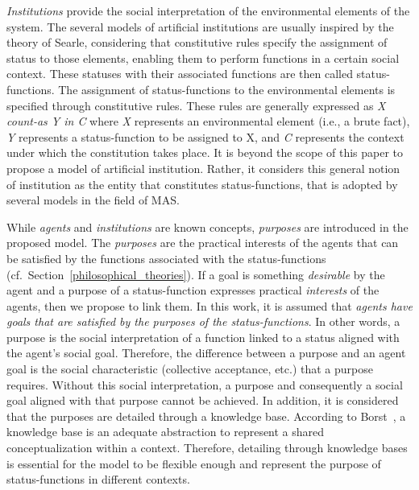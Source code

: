\documentclass[runningheads]{llncs}
\begin{document}
\emph{Institutions} provide the social interpretation of the environmental elements of the system. The several models of artificial institutions are usually inspired by the theory of Searle, considering that constitutive rules specify the assignment of status to those elements, enabling them to perform functions in a certain social context. These statuses with their associated functions are then called status-functions. 
The assignment of status-functions to the environmental elements is specified through constitutive rules. 
These rules are generally expressed as \emph{X count-as Y in C} where \emph{X} represents an environmental element (i.e., a brute fact), \emph{Y} represents a status-function to be assigned to X, and \emph{C} represents the context under which the constitution takes place. It is beyond the scope of this paper to propose a model of artificial institution. Rather, it considers this general notion of institution as the entity that constitutes status-functions, that is adopted by several models in the field of MAS.


While \emph{agents} and \emph{institutions} are known concepts, \emph{purposes} are introduced in the proposed model.
The \emph{purposes} are the practical interests of the agents that can be satisfied by the functions associated with the status-functions (cf.~Section~\ref{philosophical_theories}). If a goal is something \emph{desirable} by the agent and a purpose of a status-function expresses practical \emph{interests} of the agents, then we propose to link them. 
In this work, it is assumed that \textit{agents have goals that are satisfied by the purposes of the status-functions}. 
In other words, a purpose is the social interpretation of a function linked to a status aligned with the agent's social goal. Therefore, the difference between a purpose and an agent goal is the social characteristic (collective acceptance, etc.) that a purpose requires. Without this social interpretation, a purpose and consequently a social goal aligned with that purpose cannot be achieved.
In addition, it is considered that the purposes are detailed through a knowledge base. 
According to Borst~\cite{borst1999construction}, a knowledge base is an adequate abstraction to represent a shared conceptualization within a context.  Therefore, detailing through knowledge bases is essential for the model to be flexible enough and represent the purpose of status-functions in different contexts.
\end{document}
